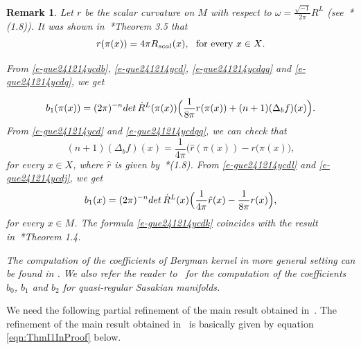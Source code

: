 \documentclass[12pt]{amsart}
\newtheorem{remark}[theorem]{Remark}
\theoremstyle{definition}
\theoremstyle{named}
\numberwithin{equation}{subsection}
\begin{document}
\begin{remark}
Let $r$ be the scalar curvature on $M$ with respect to $\omega=\frac{\sqrt{-1}}{2\pi}R^L$ (see~\cite{Hsiao_BT_coefficient_2012}*{(1.8)}). 
It was shown in~\cite{Herrmann_Hsiao_Li_Q-R-Sasakian_Szego_2018}*{Theorem 3.5} that \begin{equation}\label{e-gue241214ycdq}
r(\pi(x))=4\pi R_{\rm{scal}}(x),\ \ \mbox{for every $x\in X$}.
\end{equation}

From \eqref{e-gue241214ycdb}, \eqref{e-gue241214ycd}, \eqref{e-gue241214ycdqq} and \eqref{e-gue241214ycdq}, we get 

\begin{equation}\label{e-gue241214ycdl}
b_1(\pi(x))=(2\pi)^{-n}{\rm det\,}\dot{R}^L(\pi(x))\Bigr(\frac{1}{8\pi}r(\pi(x))
+(n+1)(\Delta_bf)(x)\Bigr).
\end{equation}
From \eqref{e-gue241214ycd} and \eqref{e-gue241214ycdqq}, we can check that 
\begin{equation}\label{e-gue241214ycdj}
(n+1)(\Delta_bf)(x)=\frac{1}{4\pi}\Bigr(\hat r(\pi(x))-r(\pi(x)\Bigr),
\end{equation}
for every $x\in X$, where $\hat r$ is given by~\cite{Hsiao_BT_coefficient_2012}*{(1.8)}. From \eqref{e-gue241214ycdl} and \eqref{e-gue241214ycdj}, we get 
\begin{equation}\label{e-gue241214ycdk}
b_1(x)=(2\pi)^{-n}{\rm det\,}\dot{R}^L(x)\Bigr(\frac{1}{4\pi}\hat r(x)-\frac{1}{8\pi}r(x)\Bigr),
\end{equation}
for every $x\in M$. The formula \eqref{e-gue241214ycdk} coincides with the result in~\cite{Hsiao_BT_coefficient_2012}*{Theorem 1.4}. 

The computation of the coefficients of Bergman kernel in more general setting can be found in \cite{Ma_Marinescu_JRAM_2012}. We also refer the reader to~\cite{Herrmann_Hsiao_Li_Q-R-Sasakian_Szego_2018} for the computation of the coefficients  \(b_0\), \(b_1\) and \(b_2\) for quasi-regular Sasakian manifolds.
\end{remark}



We need the following partial refinement of the main result obtained in~\cite{HHMS23}. The refinement of the main result obtained in~\cite{HHMS23} is basically given by equation \eqref{eqn:ThmI1InProof} below.   
\end{document}
